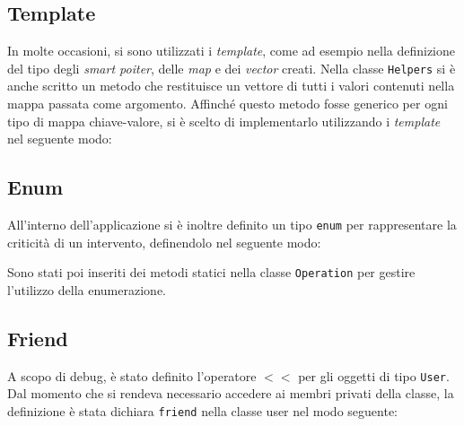 \subsection{Template}
In molte occasioni, si sono utilizzati i \textit{template}, come ad esempio nella definizione del tipo degli \textit{smart poiter}, delle \textit{map} e dei \textit{vector} creati. Nella classe \texttt{Helpers} si è anche scritto un metodo che restituisce un vettore di tutti i valori contenuti nella mappa passata come argomento. Affinché questo metodo fosse generico per ogni tipo di mappa chiave-valore, si è scelto di implementarlo utilizzando i \textit{template} nel seguente modo:


\subsection{Enum}
All'interno dell'applicazione si è inoltre definito un tipo \texttt{enum} per rappresentare la criticità di un intervento, definendolo nel seguente modo:

Sono stati poi inseriti dei metodi statici nella classe \texttt{Operation} per gestire l'utilizzo della enumerazione.

\subsection{Friend}
A scopo di debug, è stato definito l'operatore $<<$ per gli oggetti di tipo \texttt{User}. Dal momento che si rendeva necessario accedere ai membri privati della classe, la definizione è stata dichiara \texttt{friend} nella classe user nel modo seguente:


